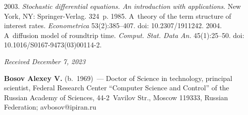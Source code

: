 \begin{multicols}{2}
{{\begin{thebibliography}{99}
       2003. \textit{Stochastic differential equations. An 
introduction with applications}. New York, NY: Springer-Verlag. 324~p.
       1985. A~theory of the 
term structure of interest rates. \textit{Econometrica} 53(2):385--407. doi: 
10.2307/1911242.
       2004. A~diffusion model of roundtrip 
time. \textit{Comput. Stat. Data An.} 45(1):25--50. doi:  
10.1016/S0167-9473(03)00114-2.

\end{thebibliography}

 }
 }

\end{multicols}

\vspace*{-6pt}

\hfill{\small\textit{Received December 7, 2023}} 

     
     \Contrl
     
     \vspace*{-3pt}
     
     \noindent
     \textbf{Bosov Alexey V.} (b.\ 1969)~--- Doctor of Science in technology, 
principal scientist, Federal Research Center ``Computer Science and Control'' of 
the Russian Academy of Sciences, 44-2~Vavilov Str., Moscow 119333, Russian 
Federation; \mbox{avbosov@ipiran.ru}


\label{end\stat}

\renewcommand{\bibname}{\protect\rm Литература} 